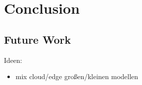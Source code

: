 \chapter{Conclusion}
\label{chap:conclusion}
\section{Future Work}
Ideen:
\begin{itemize}
    \item mix cloud/edge großen/kleinen modellen
\end{itemize}
\endinput 
